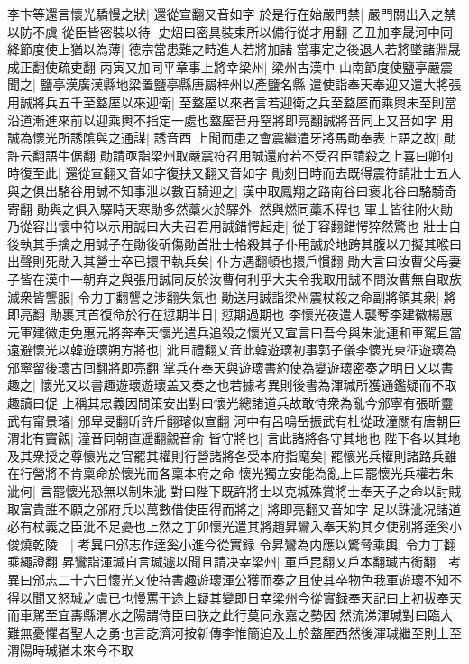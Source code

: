 李卞等還言懷光驕慢之狀|{
	還從宣翻又音如字}
於是行在始嚴門禁|{
	嚴門關出入之禁以防不虞}
從臣皆密裝以待|{
	史炤曰密具裝束所以備行從才用翻}
乙丑加李晟河中同絳節度使上猶以為薄|{
	德宗當患難之時進人若將加諸當事定之後退人若將墜諸淵晟成正翻使疏吏翻}
丙寅又加同平章事上將幸梁州|{
	梁州古漢中}
山南節度使鹽亭嚴震聞之|{
	鹽亭漢廣漢縣地梁置鹽亭縣唐屬梓州以產鹽名縣}
遣使詣奉天奉迎又遣大將張用誠將兵五千至盩厔以來迎衛|{
	至盩厔以來者言若迎衛之兵至盩厔而乘輿未至則當沿道漸進來前以迎乘輿不指定一處也盩厔音舟窒將即亮翻誠將音同上又音如字}
用誠為懷光所誘隂與之通謀|{
	誘音酉}
上聞而患之會震繼遣牙將馬勛奉表上語之故|{
	勛許云翻語牛倨翻}
勛請亟詣梁州取嚴震符召用誠還府若不受召臣請殺之上喜曰卿何時復至此|{
	還從宣翻又音如字復扶又翻又音如字}
勛刻日時而去既得震符請壯士五人與之俱出駱谷用誠不知事泄以數百騎迎之|{
	漢中取鳳翔之路南谷曰褒北谷曰駱騎奇寄翻}
勛與之俱入驛時天寒勛多然藁火於驛外|{
	然與燃同藁禾稈也}
軍士皆往附火勛乃從容出懷中符以示用誠曰大夫召君用誠錯愕起走|{
	從于容翻錯愕猝然驚也}
壯士自後執其手擒之用誠子在勛後斫傷勛首壯士格殺其子仆用誠於地跨其腹以刀擬其喉曰出聲則死勛入其營士卒已擐甲執兵矣|{
	仆方遇翻頓也擐戶慣翻}
勛大言曰汝曹父母妻子皆在漢中一朝弃之與張用誠同反於汝曹何利乎大夫令我取用誠不問汝曹無自取族滅衆皆讋服|{
	令力丁翻讋之涉翻失氣也}
勛送用誠詣梁州震杖殺之命副將領其衆|{
	將即亮翻}
勛裹其首復命於行在愆期半日|{
	愆期過期也}
李懷光夜遣人襲奪李建徽楊惠元軍建徽走免惠元將奔奉天懷光遣兵追殺之懷光又宣言曰吾今與朱泚連和車駕且當遠避懷光以韓遊瓌朔方將也|{
	泚且禮翻又音此韓遊瓌初事郭子儀李懷光東征遊瓌為邠寧留後瓌古囘翻將即亮翻}
掌兵在奉天與遊瓌書約使為變遊瓌密奏之明日又以書趣之|{
	懷光又以書趣遊瓌遊瓌盖又奏之也若據考異則後書為渾瑊所獲通鑑疑而不取趣讀曰促}
上稱其忠義因問策安出對曰懷光總諸道兵故敢恃衆為亂今邠寧有張昕靈武有甯景璿|{
	邠卑旻翻昕許斤翻璿似宣翻}
河中有呂鳴岳振武有杜從政潼關有唐朝臣渭北有竇覦|{
	潼音同朝直遥翻覦音俞}
皆守將也|{
	言此諸將各守其地也}
陛下各以其地及其衆授之尊懷光之官罷其權則行營諸將各受本府指麾矣|{
	罷懷光兵權則諸路兵雖在行營將不肯稟命於懷光而各稟本府之命}
懷光獨立安能為亂上曰罷懷光兵權若朱泚何|{
	言罷懷光恐無以制朱泚}
對曰陛下既許將士以克城殊賞將士奉天子之命以討賊取富貴誰不願之邠府兵以萬數借使臣得而將之|{
	將即亮翻又音如字}
足以誅泚况諸道必有杖義之臣泚不足憂也上然之丁卯懷光遣其將趙昇鸞入奉天約其夕使别將逹奚小俊燒乾陵　|{
	考異曰邠志作逹奚小進今從實録}
令昇鸞為内應以驚脅乘輿|{
	令力丁翻乘繩證翻}
昇鸞詣渾瑊自言瑊遽以聞且請决幸梁州|{
	軍戶昆翻又戶本翻瑊古銜翻　考異曰邠志二十六日懷光又使持書趣遊瓌渾公獲而奏之且使其卒物色我軍遊瓌不知不得以聞又怒瑊之虞已也慢罵于途上疑其變即日幸梁州今從實録奉天記曰上初拔奉天而車駕至宜夀縣渭水之陽謂侍臣曰朕之此行莫同永嘉之勢因然流涕渾瑊對曰臨大難無憂懼者聖人之勇也言訖濟河按新傳李惟簡追及上於盩厔西然後渾瑊繼至則上至渭陽時瑊猶未來今不取}
